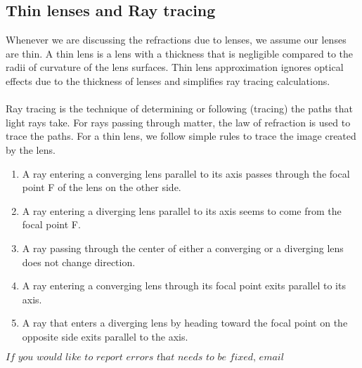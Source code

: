 \documentclass[11pt]{article}
\begin{document}
	\subsection*{Thin lenses and Ray tracing}
	Whenever we are discussing the refractions due to lenses, we assume our lenses are thin. A thin lens is a lens with a thickness that is negligible compared to the radii of curvature of the lens surfaces. Thin lens approximation ignores optical effects due to the thickness of lenses and simplifies ray tracing calculations. \\ \\
	Ray tracing is the technique of determining or following (tracing) the paths that light rays take. For rays passing through matter, the law of refraction is used to trace the paths. For a thin lens, we follow simple rules to trace the image created by the lens.
	\begin{enumerate}
		\item A ray entering a converging lens parallel to its axis passes through the focal point F of the lens on the other side. 
		\item A ray entering a diverging lens parallel to its axis seems to come from the focal point F. 
		\item A ray passing through the center of either a converging or a diverging lens does not change direction. 
		\item A ray entering a converging lens through its focal point exits parallel to its axis. 
		\item A ray that enters a diverging lens by heading toward the focal point on the opposite side exits parallel to the axis. 
	\end{enumerate}
	$$\textit{If you would like to report errors that needs to be fixed, email aaron@stjohn.edu.et}$$
\end{document}
